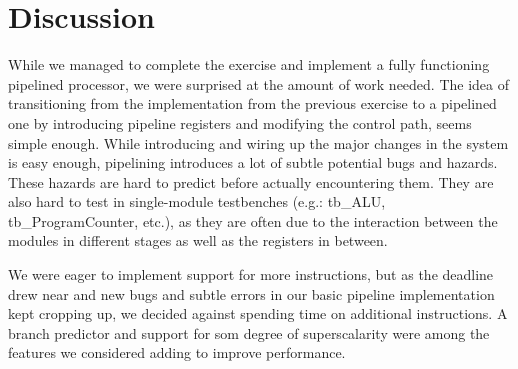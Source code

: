 \chapter{Discussion}

While we managed to complete the exercise and implement a fully functioning pipelined processor, we were surprised at the amount of work needed.
The idea of transitioning from the implementation from the previous exercise to a pipelined one by introducing pipeline registers and modifying the control path, seems simple enough.
While introducing and wiring up the major changes in the system is easy enough, pipelining introduces a lot of subtle potential bugs and hazards.
These hazards are hard to predict before actually encountering them.
They are also hard to test in single-module testbenches (e.g.: tb\_ALU, tb\_ProgramCounter, etc.), as they are often due to the interaction between the modules in different stages as well as the registers in between.

We were eager to implement support for more instructions, but as the deadline drew near and new bugs and subtle errors in our basic pipeline implementation kept cropping up, we decided against spending time on additional instructions.
A branch predictor and support for som degree of superscalarity were among the features we considered adding to improve performance.
